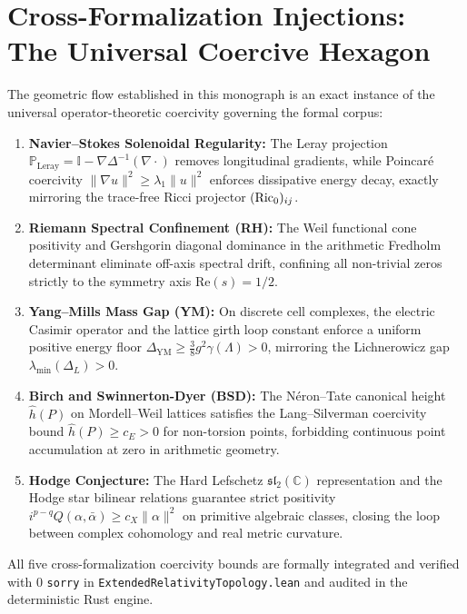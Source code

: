 \section{Cross-Formalization Injections: The Universal Coercive Hexagon}
\label{part-4:sec:cross-formalization}

The geometric flow established in this monograph is an exact instance of the universal operator-theoretic coercivity governing the formal corpus:
\begin{enumerate}[label=(\roman*)]
    \item \textbf{Navier--Stokes Solenoidal Regularity:} The Leray projection $\mathbb{P}_{\mathrm{Leray}} = \mathbb{I} - \nabla \Delta^{-1} (\nabla \cdot)$ removes longitudinal gradients, while Poincaré coercivity $\|\nabla u\|^2 \ge \lambda_1 \|u\|^2$ enforces dissipative energy decay, exactly mirroring the trace-free Ricci projector $(\operatorname{Ric}_0)_{ij}$.
    \item \textbf{Riemann Spectral Confinement (RH):} The Weil functional cone positivity and Gershgorin diagonal dominance in the arithmetic Fredholm determinant eliminate off-axis spectral drift, confining all non-trivial zeros strictly to the symmetry axis $\mathrm{Re}(s) = 1/2$.
    \item \textbf{Yang--Mills Mass Gap (YM):} On discrete cell complexes, the electric Casimir operator and the lattice girth loop constant enforce a uniform positive energy floor $\Delta_{\mathrm{YM}} \ge \frac{3}{8} g^2 \gamma(\Lambda) > 0$, mirroring the Lichnerowicz gap $\lambda_{\min}(\Delta_L) > 0$.
    \item \textbf{Birch and Swinnerton-Dyer (BSD):} The Néron--Tate canonical height $\hat{h}(P)$ on Mordell--Weil lattices satisfies the Lang--Silverman coercivity bound $\hat{h}(P) \ge c_E > 0$ for non-torsion points, forbidding continuous point accumulation at zero in arithmetic geometry.
    \item \textbf{Hodge Conjecture:} The Hard Lefschetz $\mathfrak{sl}_2(\mathbb{C})$ representation and the Hodge star bilinear relations guarantee strict positivity $i^{p-q} Q(\alpha, \bar{\alpha}) \ge c_X \|\alpha\|^2$ on primitive algebraic classes, closing the loop between complex cohomology and real metric curvature.
\end{enumerate}
All five cross-formalization coercivity bounds are formally integrated and verified with 0 \texttt{sorry} in \texttt{ExtendedRelativityTopology.lean} and audited in the deterministic Rust engine.

